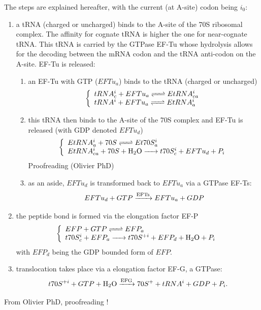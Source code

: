 The steps are explained hereafter, with the current (at A-site) codon being $i_0$:
\begin{enumerate}
  \item a tRNA (charged or uncharged) binds to the A-site of the 70S ribosomal complex. The affinity for cognate tRNA is higher the one for near-cognate tRNA. This tRNA is carried by the GTPase EF-Tu whose hydrolysis allows for the decoding between the mRNA codon and the tRNA anti-codon on the A-site. EF-Tu is released:
      \begin{enumerate}
        \item an EF-Tu with GTP ($EFTu_a$) binds to the tRNA (charged or uncharged)
          $$
            \left\{
            \begin{array}{l}
              \reactionRev{tRNA^i_c + EFTu_a}{EtRNA^i_{ca}}{}{} \\
              \reactionRev{tRNA^i + EFTu_a}{EtRNA^i_{a}}{}{} \\
            \end{array}
          \right.
          $$
        \item this tRNA then binds to the A-site of the 70S complex and EF-Tu is released (with GDP denoted $EFTu_d$)
          $$
            \left\{
            \begin{array}{l}
              \reactionRev{EtRNA^i_{a} + 70S}{Et70S^i_{a}}{}{} \\
              \reactionIrr{EtRNA^i_{ca} + 70S +\ce{H2O}}{t70S^i_{c} + EFTu_d + P_i}{}{} \\
            \end{array}
          \right.
          $$
          \textcolor[rgb]{1.00,0.00,0.00}{Proofreading (Olivier PhD)}
        \item as an aside, $EFTu_d$ is transformed back to $EFTu_a$ via a GTPase EF-Ts:
          $$
            \reactionIrr{EFTu_d + GTP}{EFTu_a + GDP}{EFTs}{}
          $$
      \end{enumerate}
  \item the peptide bond is formed via the elongation factor EF-P
    $$
      \left\{
        \begin{array}{l}
          \reactionRev{EFP + GTP}{EFP_a}{}{} \\
          \reactionIrr{t70S^i_{c} + EFP_a}{t70S^{+i} + EFP_d + \ce{H2O} + P_i}{}{} \\
        \end{array}
      \right.
    $$
    with $EFP_d$ being the GDP bounded form of $EFP$.
  \item translocation takes place via a elongation factor EF-G, a GTPase:
    $$
      \reactionIrr{t70S^{+i} + GTP+\ce{H2O}}{70S^{+} + tRNA^i + GDP + P_i}{EFG}{}.
    $$
\end{enumerate}
\textcolor[rgb]{1.00,0.00,0.00}{From Olivier PhD, proofreading !}


